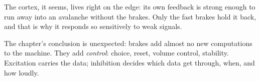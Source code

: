 The cortex, it seems, lives right on the edge: its own feedback is strong enough to run away into an avalanche without the brakes. Only the fast brakes hold it back, and that is why it responds so sensitively to weak signals.

The chapter's conclusion is unexpected: brakes add almost no new computations to the machine. They add \emph{control}: choice, reset, volume control, stability. Excitation carries the data; inhibition decides which data get through, when, and how loudly.

